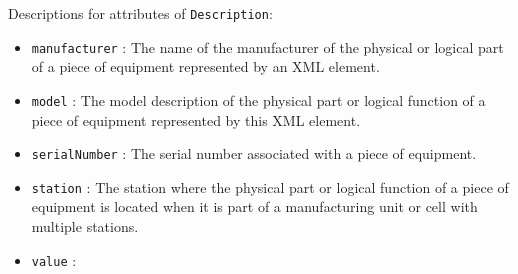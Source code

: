 Descriptions for attributes of \texttt{Description}:

\begin{itemize}
\item \texttt{manufacturer} : The name of the manufacturer of the physical or logical part of a piece of equipment represented by an XML element.
\item \texttt{model} : The model description of the physical part or logical function of a piece of equipment represented by this XML element.
\item \texttt{serialNumber} : The serial number associated with a piece of equipment.
\item \texttt{station} : The station where the physical part or logical function of a piece of equipment is located when it is part of a manufacturing unit or cell with multiple stations.
\item \texttt{value} : 
\end{itemize}
\FloatBarrier
